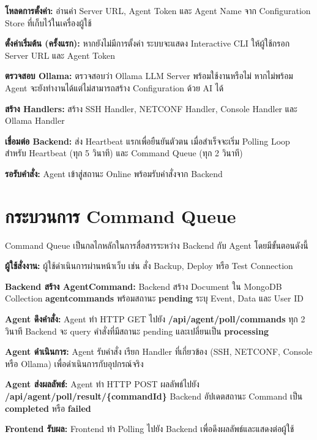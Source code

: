 \begin{mycustomenum2}
    \item \textbf{โหลดการตั้งค่า:} อ่านค่า Server URL, Agent Token และ Agent Name จาก Configuration Store ที่เก็บไว้ในเครื่องผู้ใช้
    \item \textbf{ตั้งค่าเริ่มต้น (ครั้งแรก):} หากยังไม่มีการตั้งค่า ระบบจะแสดง Interactive CLI ให้ผู้ใช้กรอก Server URL และ Agent Token
    \item \textbf{ตรวจสอบ Ollama:} ตรวจสอบว่า Ollama LLM Server พร้อมใช้งานหรือไม่ หากไม่พร้อม Agent จะยังทำงานได้แต่ไม่สามารถสร้าง Configuration ด้วย AI ได้
    \item \textbf{สร้าง Handlers:} สร้าง SSH Handler, NETCONF Handler, Console Handler และ Ollama Handler
    \item \textbf{เชื่อมต่อ Backend:} ส่ง Heartbeat แรกเพื่อยืนยันตัวตน เมื่อสำเร็จจะเริ่ม Polling Loop สำหรับ Heartbeat (ทุก 5 วินาที) และ Command Queue (ทุก 2 วินาที)
    \item \textbf{รอรับคำสั่ง:} Agent เข้าสู่สถานะ Online พร้อมรับคำสั่งจาก Backend
\end{mycustomenum2}

\section{กระบวนการ Command Queue}
\hspace*{1.3em}
Command Queue เป็นกลไกหลักในการสื่อสารระหว่าง Backend กับ Agent โดยมีขั้นตอนดังนี้

\begin{mycustomenum2}
    \item \textbf{ผู้ใช้สั่งงาน:} ผู้ใช้ดำเนินการผ่านหน้าเว็บ เช่น สั่ง Backup, Deploy หรือ Test Connection
    \item \textbf{Backend สร้าง AgentCommand:} Backend สร้าง Document ใน MongoDB Collection \textbf{agentcommands} พร้อมสถานะ \textbf{pending} ระบุ Event, Data และ User ID
    \item \textbf{Agent ดึงคำสั่ง:} Agent ทำ HTTP GET ไปยัง \textbf{/api/agent/poll/commands} ทุก 2 วินาที Backend จะ query คำสั่งที่มีสถานะ pending และเปลี่ยนเป็น \textbf{processing}
    \item \textbf{Agent ดำเนินการ:} Agent รับคำสั่ง เรียก Handler ที่เกี่ยวข้อง (SSH, NETCONF, Console หรือ Ollama) เพื่อดำเนินการกับอุปกรณ์จริง
    \item \textbf{Agent ส่งผลลัพธ์:} Agent ทำ HTTP POST ผลลัพธ์ไปยัง \textbf{/api/agent/poll/result/\{commandId\}} Backend อัปเดตสถานะ Command เป็น \textbf{completed} หรือ \textbf{failed}
    \item \textbf{Frontend รับผล:} Frontend ทำ Polling ไปยัง Backend เพื่อดึงผลลัพธ์และแสดงต่อผู้ใช้
\end{mycustomenum2}


